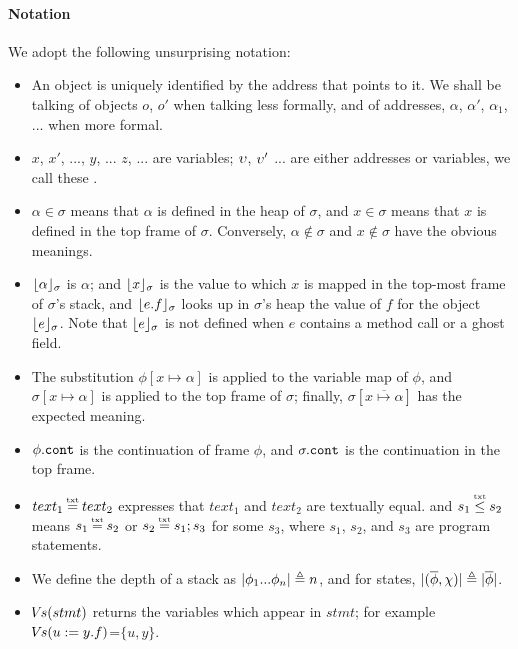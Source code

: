 {\paragraph{Notation} We adopt the following unsurprising notation:
\begin{itemize}
\item
{An object is uniquely identified by the address that points to it. We shall be talking of objects $o$, $o'$ when talking less formally, and of addresses, $\alpha$, $\alpha'$, $\alpha_1$, ...  when more formal.}
\item
$x$, $x'$,  ..., $y$, ... $z$, ... are variables;  $\upsilon$, $\upsilon'$ ... are either addresses or variables, we call these \emph{\atoms}.
\item
$\alpha \in \sigma$ means that $\alpha$ is defined in the heap of $\sigma$, and $x\in \sigma$ means that $x$ is defined in the top frame of $\sigma$.
Conversely,  $\alpha\notin\sigma$ and $x\notin\sigma$ %
 have the obvious meanings.
\item
$\lfloor \alpha \rfloor_{\sigma}$  is $\alpha$; and $\lfloor x \rfloor_{\sigma}$  is the value to which  $x$  is mapped in the top-most frame of $\sigma$'s stack, 
and $\lfloor e.f \rfloor_{\sigma}$ looks up in $\sigma$'s heap the value of $f$ for the object  $\lfloor e \rfloor_{\sigma}$.
Note that $\lfloor e \rfloor_{\sigma}$ is not defined when $e$ contains a method call or a ghost field.
\item The substitution
$\phi[x \mapsto \alpha]$ is applied to the variable map  of $\phi$,  
and  $\sigma[x \mapsto \alpha]$ is applied to the top frame of $\sigma$; finally,  $\sigma[\overline{x \mapsto \alpha}]$ %
has the expected meaning.
\item
$\phi.\mbox{\normalfont{\texttt{cont}}}$ is the continuation of frame $\phi$, and  $\sigma.\mbox{\normalfont{\texttt{cont}}}$ is the continuation in the top frame.
\item
$text_1 \txteq text_2$ expresses that $text_1$ and $text_2$ are textually equal.  
and $s_1 \txtin   s_2$  means  $s_1 \txteq  s_2$ or  $s_2 \txteq  s_1; s_3$ for some $s_3$, where $s_1$, $s_2$, and $s_3$ are program statements. 
\item
{We define the depth of a stack as $|\phi_1...\phi_n| \triangleq n$, and for states, $|(\overline \phi, \chi)| \triangleq  |\overline \phi|$.}
\item
{ ${\hspace{-1pt}V\hspace{-1pt}}s(stmt)$ returns the variables which appear in $stmt$; for example ${\hspace{-1pt}V\hspace{-1pt}}s(u:=y.f)$=$\{u,y\}$.}
\end{itemize}

}
